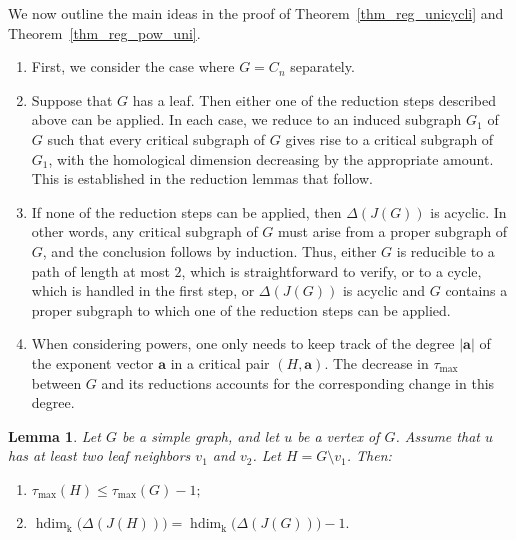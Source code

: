 \documentclass[12pt,amscd]{amsart}
\newtheorem{lem}[thm]{Lemma}
\theoremstyle{definition}
\DeclareMathOperator{\hdim}{hdim}
\def\a {\mathbf a}
\def\k {\mathrm k}
\begin{document}
We now outline the main ideas in the proof of Theorem~\ref{thm_reg_unicycli} and Theorem~\ref{thm_reg_pow_uni}.
\begin{enumerate}
    \item First, we consider the case where $G = C_n$ separately.

    \item Suppose that $G$ has a leaf. Then either one of the reduction steps described above can be applied. In each case, we reduce to an induced subgraph $G_1$ of $G$ such that every critical subgraph of $G$ gives rise to a critical subgraph of $G_1$, with the homological dimension decreasing by the appropriate amount. This is established in the reduction lemmas that follow.

    \item If none of the reduction steps can be applied, then $\Delta(J(G))$ is acyclic. In other words, any critical subgraph of $G$ must arise from a proper subgraph of $G$, and the conclusion follows by induction. Thus, either $G$ is reducible to a path of length at most $2$, which is straightforward to verify, or to a cycle, which is handled in the first step, or $\Delta(J(G))$ is acyclic and $G$ contains a proper subgraph to which one of the reduction steps can be applied.
    \item When considering powers, one only needs to keep track of the degree $|\a|$ of the exponent vector $\a$ in a critical pair $(H,\a)$. The decrease in $\tau_{\max}$ between $G$ and its reductions accounts for the corresponding change in this degree.
\end{enumerate}

\begin{lem}\label{lem_reduction_1}
Let $G$ be a simple graph, and let $u$ be a vertex of $G$. Assume that $u$ has at least two leaf neighbors $v_1$ and $v_2$. Let $H = G \setminus v_1$. Then:
\begin{enumerate}
    \item
    \(    \tau_{\max}(H) \le \tau_{\max}(G) - 1;    \)
    
    \item
    \(    \hdim_{\k}\bigl(\Delta(J(H))\bigr)
    =
    \hdim_{\k}\bigl(\Delta(J(G))\bigr) - 1.
    \)
\end{enumerate}
\end{lem}
\end{document}
